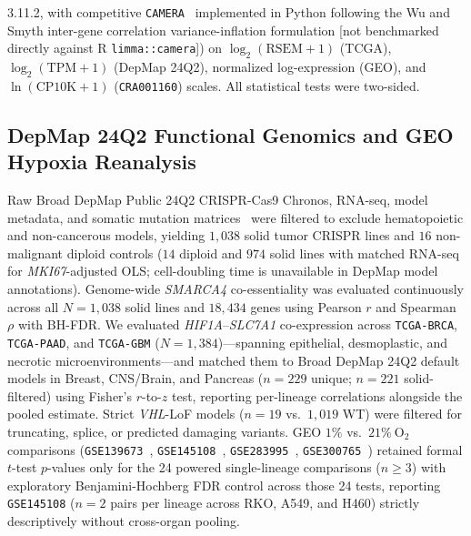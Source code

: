 \documentclass[11pt]{article}
\begin{document}
3.11.2, with competitive \texttt{CAMERA}~\cite{wu2012} implemented in Python following the Wu and Smyth inter-gene correlation variance-inflation formulation [not benchmarked directly against R \texttt{limma::camera}]) on $\log_2(\text{RSEM}+1)$ (TCGA), $\log_2(\text{TPM}+1)$ (DepMap 24Q2), normalized log-expression (GEO), and $\ln(\text{CP10K}+1)$ (\texttt{CRA001160}) scales. All statistical tests were two-sided.

\subsection{DepMap 24Q2 Functional Genomics and GEO Hypoxia Reanalysis}
Raw Broad DepMap Public 24Q2 CRISPR-Cas9 Chronos, RNA-seq, model metadata, and somatic mutation matrices~\cite{depmap2021} were filtered to exclude hematopoietic and non-cancerous models, yielding $1,038$ solid tumor CRISPR lines and $16$ non-malignant diploid controls ($14$ diploid and $974$ solid lines with matched RNA-seq for \textit{MKI67}-adjusted OLS; cell-doubling time is unavailable in DepMap model annotations). Genome-wide \textit{SMARCA4} co-essentiality was evaluated continuously across all $N = 1,038$ solid lines and $18,434$ genes using Pearson $r$ and Spearman $\rho$ with BH-FDR. We evaluated \textit{HIF1A}--\textit{SLC7A1} co-expression across \texttt{TCGA-BRCA}, \texttt{TCGA-PAAD}, and \texttt{TCGA-GBM} ($N = 1,384$)---spanning epithelial, desmoplastic, and necrotic microenvironments---and matched them to Broad DepMap 24Q2 default models in Breast, CNS/Brain, and Pancreas ($n = 229$ unique; $n = 221$ solid-filtered) using Fisher's $r$-to-$z$ test, reporting per-lineage correlations alongside the pooled estimate. Strict \textit{VHL}-LoF models ($n = 19$ vs.\ $1,019$ WT) were filtered for truncating, splice, or predicted damaging variants. GEO $1\%$ vs.\ $21\%\ \text{O}_2$ comparisons (\texttt{GSE139673}~\cite{gse139673}, \texttt{GSE145108}~\cite{gse145108}, \texttt{GSE283995}~\cite{gse283995}, \texttt{GSE300765}~\cite{gse300765}) retained formal $t$-test $p$-values only for the 24 powered single-lineage comparisons ($n \ge 3$) with exploratory Benjamini-Hochberg FDR control across those 24 tests, reporting \texttt{GSE145108} ($n = 2$ pairs per lineage across RKO, A549, and H460) strictly descriptively without cross-organ pooling.
\end{document}
